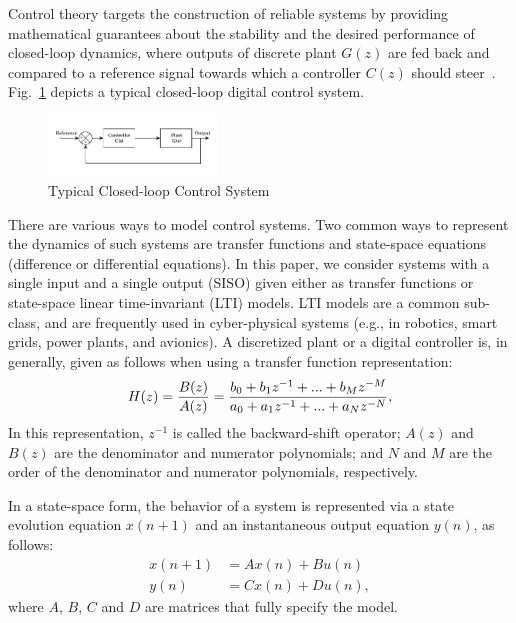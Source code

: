 \documentclass[10pt,conference]{IEEEtran}
\begin{document}
Control theory targets the construction of reliable systems by providing
mathematical guarantees about the stability and the desired performance of
closed-loop dynamics, where outputs of discrete plant $G(z)$ are fed back
and compared to a reference signal towards which a controller $C(z)$ should
steer~\cite{astrom1997computer}.  Fig.~\ref{fig:typical-control-system}
depicts a typical closed-loop digital control system.

\begin{figure}[ht!]
\centering
\includegraphics[width=0.4\textwidth]{closedloopseries.pdf}
\caption{Typical Closed-loop Control System}
\label{fig:typical-control-system}
\end{figure}


There are various ways to model control systems.  Two common ways to
represent the dynamics of such systems are transfer functions and
state-space equations (difference or differential equations).  In this
paper, we consider systems with a single input and a single output (SISO)
given either as transfer functions or state-space linear time-invariant
(LTI) models.  LTI models are a common sub-class, and are frequently used in
cyber-physical systems (e.g., in robotics, smart grids, power plants, and
avionics).  A discretized plant or a digital controller is, in generally,
given as follows when using a transfer function representation:
%
\begin{equation}
\small
\label{eq:transferfunction}
H(z)=\frac{B(z)}{A(z)}=\frac{b_{0}+b_{1}z^{-1}+...+b_{M}z^{-M}}{a_{0}+a_{1}z^{-1}+...+a_{N}z^{-N}},
\end{equation}
%
In this representation, $z^{-1}$ is called the backward-shift operator;
$A(z)$ and $B(z)$ are the denominator and numerator polynomials; and $N$ and
$M$ are the order of the denominator and numerator polynomials, respectively.

In a state-space form, the behavior of a system is represented via a state
evolution equation $x(n+1)$ and an instantaneous output equation $y(n)$, as
follows:
%
\begin{equation}
\begin{split}
x(n+1) &= A x(n) + B u(n)
\\
y(n) &= C x(n) + D u(n), 
\end{split}\label{eq:ss-example}
\end{equation}
%
where $A$, $B$, $C$ and $D$ are matrices that fully specify the model. 
\end{document}
